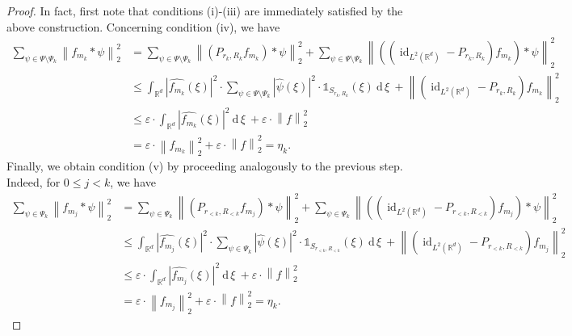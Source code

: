 \documentclass[10pt,a4paper]{amsart}
\newcommand{\R}{{\mathbb{R}}}
\newcommand{\dxi}{\:\mathrm{d}\,\xi\:}
\DeclareMathOperator{\id}{id}
\newcommand{\norm}[1]{\ensuremath{\left\lVert\text{}#1\text{}\right\rVert}}
\begin{document}
\begin{proof}
    In fact, first note that conditions (i)-(iii) are immediately satisfied by the above construction. Concerning condition (iv), we have 
      \begin{align*}
        \sum_{\psi \in \Psi\setminus\Psi_k} \norm{f_{m_k}*\psi}_2^2 
        &= \sum_{\psi \in \Psi\setminus\Psi_k} \norm{(P_{r_k,R_k}f_{m_k})*\psi}_2^2 + \sum_{\psi \in \Psi\setminus\Psi_k} \norm{((\id_{L^2(\R^d)}-P_{r_k,R_k})f_{m_k})*\psi}_2^2 \\
        &\leq \int_{\R^d} |\widehat{f_{m_k}}(\xi)|^2 \cdot \sum_{\psi \in \Psi\setminus\Psi_k} |\widehat{\psi}(\xi)|^2 \cdot \mathds{1}_{S_{r_k,R_k}}(\xi)\dxi + \norm{(\id_{L^2(\R^d)}-P_{r_k,R_k})f_{m_k}}_2^2 \\
        &\leq \varepsilon \cdot \int_{\R^d} |\widehat{f_{m_k}}(\xi)|^2 \dxi + \varepsilon \cdot \norm{f}_2^2 \\
        &= \varepsilon \cdot \norm{f_{m_k}}_2^2+\varepsilon \cdot \norm{f}_2^2 = \eta_k.
      \end{align*}  
      Finally, we obtain condition (v) by proceeding analogously to the previous step. Indeed, for $0\leq j<k$, we have
      \begin{align*}
        \sum_{\psi \in \Psi_k} \norm{f_{m_j}*\psi}_2^2 
        &= \sum_{\psi \in \Psi_k} \norm{(P_{r_{<k},R_{<k}}f_{m_j})*\psi}_2^2 + \sum_{\psi \in \Psi_k} \norm{((\id_{L^2(\R^d)}-P_{r_{<k},R_{<k}})f_{m_j})*\psi}_2^2 \\
        &\leq \int_{\R^d} |\widehat{f_{m_j}}(\xi)|^2 \cdot \sum_{\psi \in \Psi_k} |\widehat{\psi}(\xi)|^2 \cdot \mathds{1}_{S_{r_{<k},R_{<k}}}(\xi)\dxi + \norm{(\id_{L^2(\R^d)}-P_{r_{<k},R_{<k}})f_{m_j}}_2^2 \\
        &\leq \varepsilon \cdot \int_{\R^d} |\widehat{f_{m_j}}(\xi)|^2 \dxi + \varepsilon \cdot \norm{f}_2^2 \\
        &= \varepsilon \cdot \norm{f_{m_j}}_2^2+\varepsilon \cdot \norm{f}_2^2 = \eta_k.
      \end{align*}
  \end{proof}
\end{document}

